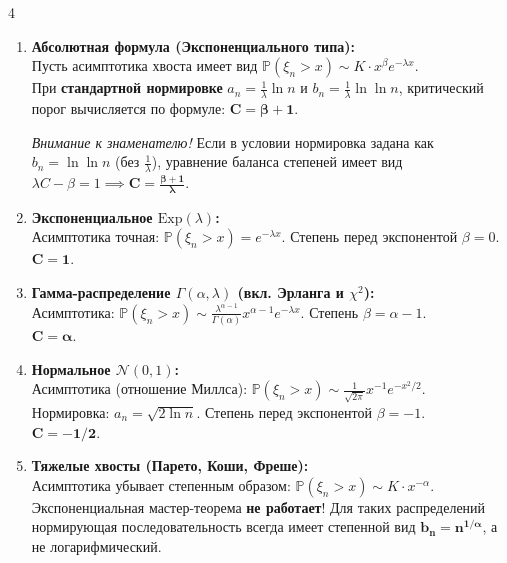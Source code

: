 \documentclass[a4paper, landscape]{article}
\renewcommand{\P}{\mathbb{P}}
\begin{document}
\begin{multicols*}{4}
\begin{enumerate}[leftmargin=*, nosep, itemsep=4pt, label=\textbf{\arabic*.}]
    \item \textbf{Абсолютная формула (Экспоненциального типа):} \\
    Пусть асимптотика хвоста имеет вид $\P(\xi_n > x) \sim K \cdot x^\beta e^{-\lambda x}$. \\
    При \textbf{стандартной нормировке} $a_n = \frac{1}{\lambda}\ln n$ и $b_n = \frac{1}{\lambda}\ln \ln n$, критический порог вычисляется по формуле: 
    $\mathbf{C = \beta + 1}$. 
    
    \textit{Внимание к знаменателю!} Если в условии нормировка задана как $b_n = \ln \ln n$ (без $\frac{1}{\lambda}$), уравнение баланса степеней имеет вид $\lambda C - \beta = 1 \implies \mathbf{C = \frac{\beta + 1}{\lambda}}$.

    \item \textbf{Экспоненциальное $\text{Exp}(\lambda)$:} \\
    Асимптотика точная: $\P(\xi_n > x) = e^{-\lambda x}$. Степень перед экспонентой $\beta = 0$. \\
    $\mathbf{C = 1}$.

    \item \textbf{Гамма-распределение $\Gamma(\alpha, \lambda)$ (вкл. Эрланга и $\chi^2$):} \\
    Асимптотика: $\P(\xi_n > x) \sim \frac{\lambda^{\alpha-1}}{\Gamma(\alpha)} x^{\alpha-1} e^{-\lambda x}$. Степень $\beta = \alpha - 1$. \\
     $\mathbf{C = \alpha}$.

    \item \textbf{Нормальное $\mathcal{N}(0, 1)$:} \\
    Асимптотика (отношение Миллса): $\P(\xi_n > x) \sim \frac{1}{\sqrt{2\pi}} x^{-1} e^{-x^2/2}$. \\
    Нормировка: $a_n = \sqrt{2\ln n}$. Степень перед экспонентой $\beta = -1$. \\
     $\mathbf{C = -1/2}$.

    \item \textbf{Тяжелые хвосты (Парето, Коши, Фреше):} \\
    Асимптотика убывает степенным образом: $\P(\xi_n > x) \sim K \cdot x^{-\alpha}$. \\
    Экспоненциальная мастер-теорема \textbf{не работает}! Для таких распределений нормирующая последовательность всегда имеет степенной вид $\mathbf{b_n = n^{1/\alpha}}$, а не логарифмический.
\end{enumerate}


\end{multicols*}
\end{document}
